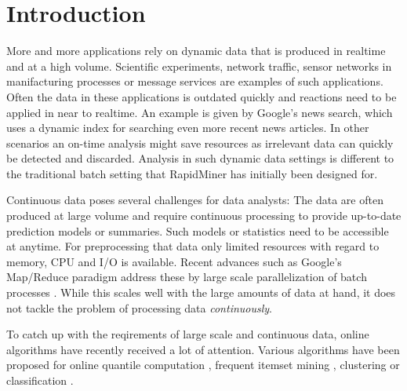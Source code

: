 \section{Introduction}
More and more applications rely on dynamic data that is produced in
realtime and at a high volume. Scientific experiments, network
traffic, sensor networks in manifacturing processes or message
services are examples of such applications. Often the data in these
applications is outdated quickly and reactions need to be applied in
near to realtime. An example is given by Google's news search, which
uses a dynamic index for searching even more recent news articles. In
other scenarios an on-time analysis might save resources as irrelevant
data can quickly be detected and discarded. Analysis in such dynamic
data settings is different to the traditional batch setting that
RapidMiner has initially been designed for.

Continuous data poses several challenges for data analysts: The data
are often produced at large volume and require continuous processing
to provide up-to-date prediction models or summaries. Such models or
statistics need to be accessible at anytime. For preprocessing that
data only limited resources with regard to memory, CPU and I/O is
available. Recent advances such as Google's Map/Reduce paradigm
address these by large scale parallelization of batch processes
\cite{googleMapReduce,radoop}. While this scales well with the large
amounts of data at hand, it does not tackle the problem of processing
data {\em continuously}.


To catch up with the reqirements of large scale and continuous data,
online algorithms have recently received a lot of attention. Various
algorithms have been proposed for online quantile computation
\cite{Greenwald/Khanna/2001a,Arasu/Manku/2004a}, frequent itemset
mining
\cite{Charikar02findingfrequent,goethals2007,Cheng06maintainingfrequent},
clustering \cite{sohler2010,Aggarwal:2003} or classification
\cite{Domingos/Hulten/2000a}.


